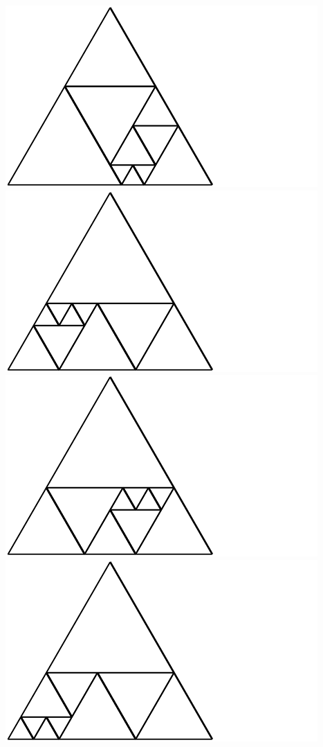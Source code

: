\documentclass[12pt,amstags,fleqn]{article}
\theoremstyle{plain}
\theoremstyle{definition}
\begin{document}
\includegraphics{output-dissections-dissection10_i19_r3_c3.pdf}
\includegraphics{output-dissections-dissection10_i21_r1_c2.pdf}
\includegraphics{output-dissections-dissection10_i21_r1_c3.pdf}
\includegraphics{output-dissections-dissection10_i21_r2_c2.pdf}
\end{document}

